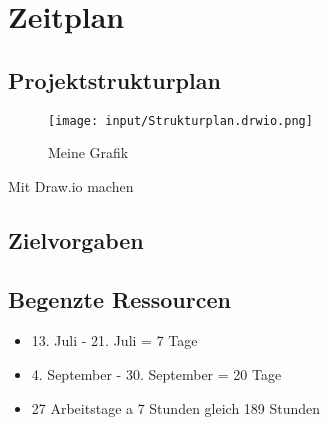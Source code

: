 \section{Zeitplan}
\subsection{Projektstrukturplan}
\begin{figure}[h]
 \centering
 \texttt{[image: input/Strukturplan.drwio.png]}
 \caption{Meine Grafik}
 \label{fig:meine-grafik}
\end{figure}
Mit Draw.io machen
\subsection{Zielvorgaben}
\subsection{Begenzte Ressourcen}
\begin{itemize}
    \item 13. Juli - 21. Juli = 7 Tage
    \item 4. September - 30. September = 20 Tage
    \item 27 Arbeitstage a 7 Stunden gleich 189 Stunden
\end{itemize}

